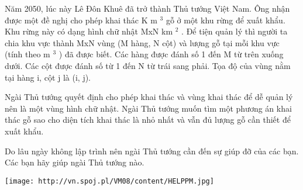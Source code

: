 Năm 2050, lúc này Lê Đôn Khuê đã trở thành Thủ tướng Việt Nam. Ông nhận được một đề nghị cho phép khai thác K m $^ 3 $ gỗ ở một khu rừng để xuất khẩu. Khu rừng này có dạng hình chữ nhật MxN km $^ 2 $ . Để tiện quản lý thì người ta chia khu vực thành MxN vùng (M hàng, N cột) và lượng gỗ tại mỗi khu vực (tính theo m $^ 3 $ ) đã được biết. Các hàng được đánh số 1 đến M từ trên xuống dưới. Các cột được đánh số từ 1 đến N từ trái sang phải. Tọa độ của vùng nằm tại hàng i, cột j là (i, j).

Ngài Thủ tướng quyết định cho phép khai thác và vùng khai thác để dễ quản lý nên là một vùng hình chữ nhật. Ngài Thủ tướng muốn tìm một phương án khai thác gỗ sao cho diện tích khai thác là nhỏ nhất và vẫn đủ lượng gỗ cần thiết để xuất khẩu.

Do lâu ngày không lập trình nên ngài Thủ tướng cần đến sự giúp đỡ của các bạn. Các bạn hãy giúp ngài Thủ tướng nào.


\texttt{[image: http://vn.spoj.pl/VM08/content/HELPPM.jpg]}

 

\